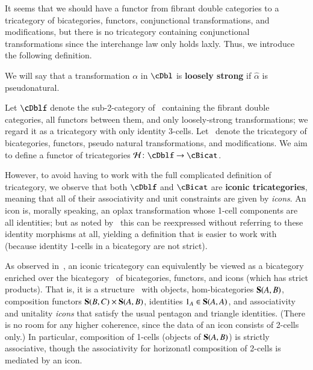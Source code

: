 


It seems that we should have a functor from fibrant double categories
to a tricategory of bicategories, functors, conjunctional
transformations, and modifications, but there is no tricategory
containing conjunctional transformations since the interchange law
only holds laxly.  Thus, we introduce the following definition.

\begin{defn}
  We will say that a transformation $\alpha$ in $\cDbl$ is \textbf{loosely strong} if $\hat\alpha$ is pseudonatural.
\end{defn}

Let $\cDblf$
denote the sub-2-category of \cDbl\ containing the fibrant double
categories, all functors between them, and only loosely-strong transformations; we regard it as a tricategory with only identity 3-cells.
Let \cBicat\ denote the tricategory of
bicategories, functors, pseudo natural transformations, and
modifications.  We aim to define a functor of tricategories $\cH\maps \cDblf\to \cBicat$.

However, to avoid having to work with the full complicated definition of tricategory, we observe that both $\cDblf$ and $\cBicat$ are \textbf{iconic tricategories}, meaning that all of their associativity and unit constraints are given by \emph{icons}.
An icon is, morally speaking, an oplax transformation whose 1-cell components are all identities; but as noted by~\cite{lack:icons} this can be reexpressed without referring to these identity morphisms at all, yielding a definition that is easier to work with (because identity 1-cells in a bicategory are not strict).

As observed in~\cite{shulman:psalg}, an iconic tricategory can equivalently be viewed as a bicategory enriched over the bicategory \Icon\ of bicategories, functors, and icons (which has strict products).
That is, it is a structure \bS\ with objects, hom-bicategories $\mathbf{S}(A,B)$, composition functors $\mathbf{S}(B,C)\times \mathbf{S}(A,B)$, identities $1_A \in \mathbf{S}(A,A)$, and associativity and unitality \emph{icons} that satisfy the usual pentagon and triangle identities.
(There is no room for any higher coherence, since the data of an icon consists of 2-cells only.)
In particular, composition of 1-cells (objects of $\mathbf{S}(A,B)$) is strictly associative, though the associativity for horizonatl composition of 2-cells is mediated by an icon.

